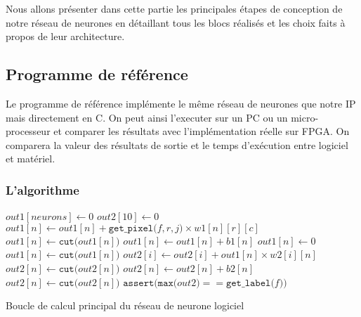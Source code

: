 
Nous allons présenter dans cette partie les principales étapes de conception
de notre réseau de neurones en détaillant tous les blocs réalisés et les choix
faits à propos de leur architecture.

\subsection{Programme de référence}
Le programme de référence implémente le même réseau de neurones que notre IP
mais directement en C. On peut ainsi l'executer sur un PC ou un micro-processeur 
et comparer les résultats avec l'implémentation réelle sur FPGA. On comparera
la valeur des résultats de sortie et le temps d'exécution entre logiciel et
matériel.

\subsubsection{L'algorithme}

\begin{algorithm}
	\SetAlgoLined
	 {
		$out1[neurons] \leftarrow 0$\;
		$out2[10] \leftarrow 0$\;
		 {
			 {
				 {
					$out1[n] \leftarrow out1[n] + \texttt{get\_pixel(}f, r, j\texttt{)} \times w1[n][r][c]$\;
				}
			}
		}
		 {
			$out1[n] \leftarrow \texttt{cut(}out1[n]\texttt{)}$\;
			$out1[n] \leftarrow out1[n] + b1[n]$\;
			 {
				$out1[n] \leftarrow 0$\;
			}
			$out1[n] \leftarrow \texttt{cut(}out1[n]\texttt{)}$\;
		}
		 {
			 {
				$out2[i] \leftarrow out2[i] + out1[n] \times w2[i][n]$\;
			}
		}
		 {
			$out2[n] \leftarrow \texttt{cut(}out2[n]\texttt{)}$\;
			$out2[n] \leftarrow out2[n] + b2[n]$\;
			$out2[n] \leftarrow \texttt{cut(}out2[n]\texttt{)}$\;
		}
		$\texttt{assert(max(}out2\texttt{)} == \texttt{get\_label(}f\texttt{))}$\;
	}
	\caption{Boucle de calcul principal du réseau de neurone logiciel}
	\label{fig:soft_nn}
\end{algorithm}

